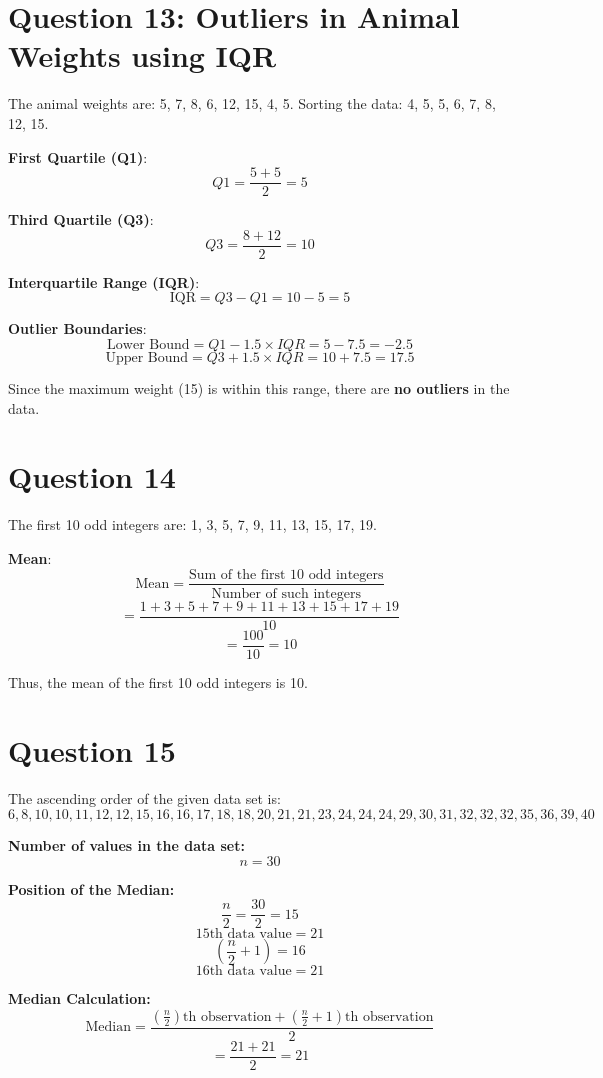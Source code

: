 \documentclass[11pt]{article}
\begin{document}
\section*{Question 13: Outliers in Animal Weights using IQR}
The animal weights are: 5, 7, 8, 6, 12, 15, 4, 5. Sorting the data: 4, 5, 5, 6, 7, 8, 12, 15.

\textbf{First Quartile (Q1)}:
\[
Q1 = \frac{5 + 5}{2} = 5
\]

\textbf{Third Quartile (Q3)}:
\[
Q3 = \frac{8 + 12}{2} = 10
\]

\textbf{Interquartile Range (IQR)}:
\[
\text{IQR} = Q3 - Q1 = 10 - 5 = 5
\]

\textbf{Outlier Boundaries}:
\[
\text{Lower Bound} = Q1 - 1.5 \times IQR = 5 - 7.5 = -2.5
\]
\[
\text{Upper Bound} = Q3 + 1.5 \times IQR = 10 + 7.5 = 17.5
\]

Since the maximum weight (15) is within this range, there are \textbf{no outliers} in the data.




\section*{Question 14}

The first 10 odd integers are: 1, 3, 5, 7, 9, 11, 13, 15, 17, 19.

\textbf{Mean}:
\[
\text{Mean} = \frac{\text{Sum of the first 10 odd integers}}{\text{Number of such integers}}
\]
\[
= \frac{1 + 3 + 5 + 7 + 9 + 11 + 13 + 15 + 17 + 19}{10}
\]
\[
= \frac{100}{10} = 10
\]

Thus, the mean of the first 10 odd integers is 10.




\section*{Question 15}

The ascending order of the given data set is:
\[
6, 8, 10, 10, 11, 12, 12, 15, 16, 16, 17, 18, 18, 20, 21, 21, 23, 24, 24, 24, 29, 30, 31, 32, 32, 32, 35, 36, 39, 40
\]

\textbf{Number of values in the data set:}
\[
n = 30
\]

\textbf{Position of the Median:}
\[
\frac{n}{2} = \frac{30}{2} = 15
\]
\[
15\text{th data value} = 21
\]
\[
\left(\frac{n}{2} + 1\right) = 16
\]
\[
16\text{th data value} = 21
\]

\textbf{Median Calculation:}
\[
\text{Median} = \frac{\left(\frac{n}{2}\right)\text{th observation} + \left(\frac{n}{2} + 1\right)\text{th observation}}{2}
\]
\[
= \frac{21 + 21}{2} = 21
\]
\end{document}
